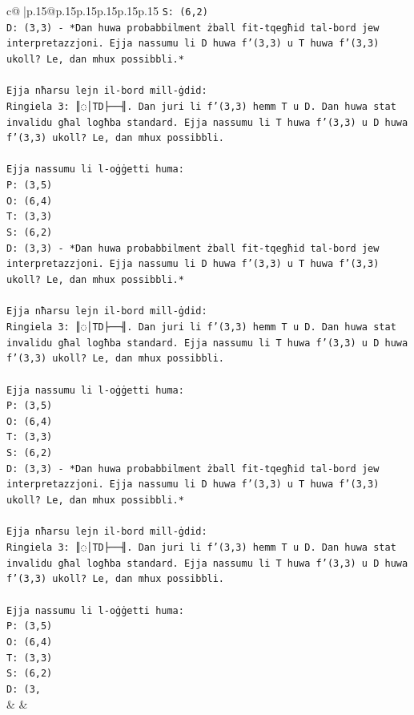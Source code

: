 \documentclass{article}
\begin{document}
{\begin{supertabular}{c@{$\;$}|p{.15\linewidth}@{}p{.15\linewidth}p{.15\linewidth}p{.15\linewidth}p{.15\linewidth}p{.15\linewidth}}
{{{\texttt{S: (6,2)} \\
\texttt{D: (3,3) {-} *Dan huwa probabbilment żball fit{-}tqegħid tal{-}bord jew interpretazzjoni. Ejja nassumu li D huwa f'(3,3) u T huwa f'(3,3) ukoll? Le, dan mhux possibbli.*} \\
\\ 
\texttt{Ejja nħarsu lejn il{-}bord mill{-}ġdid:} \\
\texttt{Ringiela 3: ║◌│TD├──╢. Dan juri li f'(3,3) hemm T u D. Dan huwa stat invalidu għal logħba standard. Ejja nassumu li T huwa f'(3,3) u D huwa f'(3,3) ukoll? Le, dan mhux possibbli.} \\
\\ 
\texttt{Ejja nassumu li l{-}oġġetti huma:} \\
\texttt{P: (3,5)} \\
\texttt{O: (6,4)} \\
\texttt{T: (3,3)} \\
\texttt{S: (6,2)} \\
\texttt{D: (3,3) {-} *Dan huwa probabbilment żball fit{-}tqegħid tal{-}bord jew interpretazzjoni. Ejja nassumu li D huwa f'(3,3) u T huwa f'(3,3) ukoll? Le, dan mhux possibbli.*} \\
\\ 
\texttt{Ejja nħarsu lejn il{-}bord mill{-}ġdid:} \\
\texttt{Ringiela 3: ║◌│TD├──╢. Dan juri li f'(3,3) hemm T u D. Dan huwa stat invalidu għal logħba standard. Ejja nassumu li T huwa f'(3,3) u D huwa f'(3,3) ukoll? Le, dan mhux possibbli.} \\
\\ 
\texttt{Ejja nassumu li l{-}oġġetti huma:} \\
\texttt{P: (3,5)} \\
\texttt{O: (6,4)} \\
\texttt{T: (3,3)} \\
\texttt{S: (6,2)} \\
\texttt{D: (3,3) {-} *Dan huwa probabbilment żball fit{-}tqegħid tal{-}bord jew interpretazzjoni. Ejja nassumu li D huwa f'(3,3) u T huwa f'(3,3) ukoll? Le, dan mhux possibbli.*} \\
\\ 
\texttt{Ejja nħarsu lejn il{-}bord mill{-}ġdid:} \\
\texttt{Ringiela 3: ║◌│TD├──╢. Dan juri li f'(3,3) hemm T u D. Dan huwa stat invalidu għal logħba standard. Ejja nassumu li T huwa f'(3,3) u D huwa f'(3,3) ukoll? Le, dan mhux possibbli.} \\
\\ 
\texttt{Ejja nassumu li l{-}oġġetti huma:} \\
\texttt{P: (3,5)} \\
\texttt{O: (6,4)} \\
\texttt{T: (3,3)} \\
\texttt{S: (6,2)} \\
\texttt{D: (3,} \\
            }
        }
    }
    & & \\ \\


\end{supertabular}}
\end{document}
